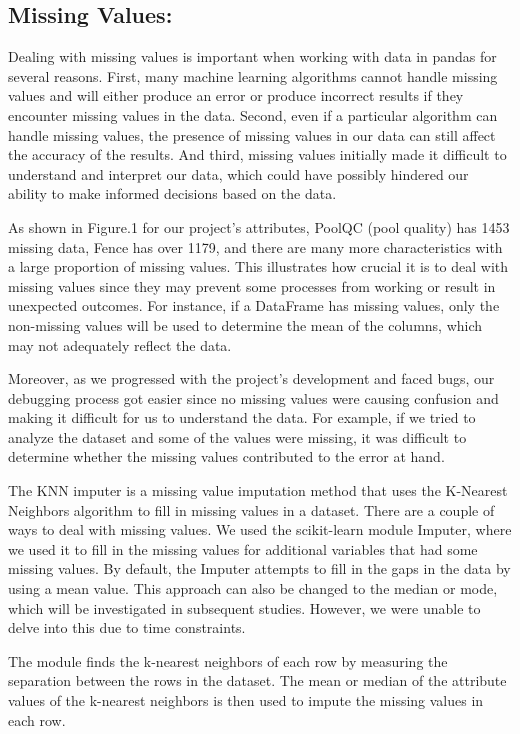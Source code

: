 \documentclass[10pt,twocolumn,letterpaper]{article}
\begin{document}
\subsection{Missing Values:}
Dealing with missing values is important when working with data in pandas for several reasons. First, many machine learning algorithms cannot handle missing values and will either produce an error or produce incorrect results if they encounter missing values in the data. Second, even if a particular algorithm can handle missing values, the presence of missing values in our data can still affect the accuracy of the results. And third, missing values initially made it difficult to understand and interpret our data, which could have possibly hindered our ability to make informed decisions based on the data. 

As shown in Figure.1 for our project's attributes, PoolQC (pool quality) has 1453 missing data, Fence has over 1179, and there are many more characteristics with a large proportion of missing values. This illustrates how crucial it is to deal with missing values since they may prevent some processes from working or result in unexpected outcomes. For instance, if a DataFrame has missing values, only the non-missing values will be used to determine the mean of the columns, which may not adequately reflect the data.

Moreover, as we progressed with the project's development and faced bugs, our debugging process got easier since no missing values were causing confusion and making it difficult for us to understand the data. For example, if we tried to analyze the dataset and some of the values were missing, it was difficult to determine whether the missing values contributed to the error at hand.

The KNN imputer is a missing value imputation method that uses the K-Nearest Neighbors algorithm to fill in missing values in a dataset. There are a couple of ways to deal with missing values. We used the scikit-learn module Imputer, where we used it to fill in the missing values for additional variables that had some missing values. By default, the Imputer attempts to fill in the gaps in the data by using a mean value. This approach can also be changed to the median or mode, which will be investigated in subsequent studies. However, we were unable to delve into this due to time constraints.

The module finds the k-nearest neighbors of each row by measuring the separation between the rows in the dataset. The mean or median of the attribute values of the k-nearest neighbors is then used to impute the missing values in each row.
\end{document}
